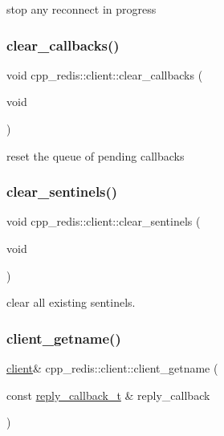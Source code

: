 stop any reconnect in progress \mbox{\label{classcpp__redis_1_1client_a64585796534941c024eaaa72f93d8977}} 
\subsubsection{\texorpdfstring{clear\+\_\+callbacks()}{clear\_callbacks()}}
{\footnotesize\ttfamily void cpp\+\_\+redis\+::client\+::clear\+\_\+callbacks (\begin{DoxyParamCaption}\item[{void}]{ }\end{DoxyParamCaption})\hspace{0.3cm}{\ttfamily [private]}}

reset the queue of pending callbacks \mbox{\label{classcpp__redis_1_1client_a68cd15d1cc30302237e3a400e2ac43f5}} 
\subsubsection{\texorpdfstring{clear\+\_\+sentinels()}{clear\_sentinels()}}
{\footnotesize\ttfamily void cpp\+\_\+redis\+::client\+::clear\+\_\+sentinels (\begin{DoxyParamCaption}\item[{void}]{ }\end{DoxyParamCaption})}

clear all existing sentinels. \mbox{\label{classcpp__redis_1_1client_ac4e058eaa75eb04c7a8017a779d5015e}} 
\subsubsection{\texorpdfstring{client\+\_\+getname()}{client\_getname()}\hspace{0.1cm}{\footnotesize\ttfamily [1/2]}}
{\footnotesize\ttfamily \hyperlink{classcpp__redis_1_1client}{client}\& cpp\+\_\+redis\+::client\+::client\+\_\+getname (\begin{DoxyParamCaption}\item[{const \hyperlink{classcpp__redis_1_1client_a061a1140d36d2eaeda82b09a0bb3f9f2}{reply\+\_\+callback\+\_\+t} \&}]{reply\+\_\+callback }\end{DoxyParamCaption})}

